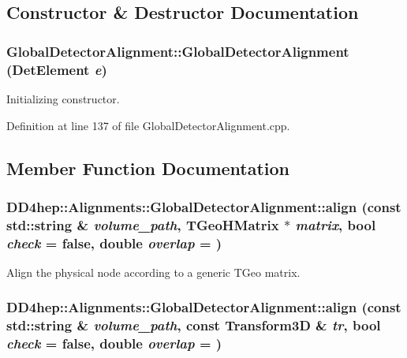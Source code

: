 \subsection{Constructor \& Destructor Documentation}
\hypertarget{class_d_d4hep_1_1_alignments_1_1_global_detector_alignment_a82f59bb92f37d35c0d9dbe2b342a25ca}{
\subsubsection[{GlobalDetectorAlignment}]{\setlength{\rightskip}{0pt plus 5cm}GlobalDetectorAlignment::GlobalDetectorAlignment ({\bf DetElement} {\em e})}}
\label{class_d_d4hep_1_1_alignments_1_1_global_detector_alignment_a82f59bb92f37d35c0d9dbe2b342a25ca}


Initializing constructor. 

Definition at line 137 of file GlobalDetectorAlignment.cpp.

\subsection{Member Function Documentation}
\hypertarget{class_d_d4hep_1_1_alignments_1_1_global_detector_alignment_a843a0475def67045c62d9bfa74fbc20c}{
\subsubsection[{align}]{ DD4hep::Alignments::GlobalDetectorAlignment::align (const std::string \& {\em volume\_\-path}, \/  TGeoHMatrix $\ast$ {\em matrix}, \/  bool {\em check} = {\ttfamily false}, \/  double {\em overlap} = {})}}
\label{class_d_d4hep_1_1_alignments_1_1_global_detector_alignment_a843a0475def67045c62d9bfa74fbc20c}


Align the physical node according to a generic TGeo matrix. \hypertarget{class_d_d4hep_1_1_alignments_1_1_global_detector_alignment_a6fd0199104c9626a04989370178c46d2}{
\subsubsection[{align}]{ DD4hep::Alignments::GlobalDetectorAlignment::align (const std::string \& {\em volume\_\-path}, \/  const Transform3D \& {\em tr}, \/  bool {\em check} = {\ttfamily false}, \/  double {\em overlap} = {})}}
\label{class_d_d4hep_1_1_alignments_1_1_global_detector_alignment_a6fd0199104c9626a04989370178c46d2}


